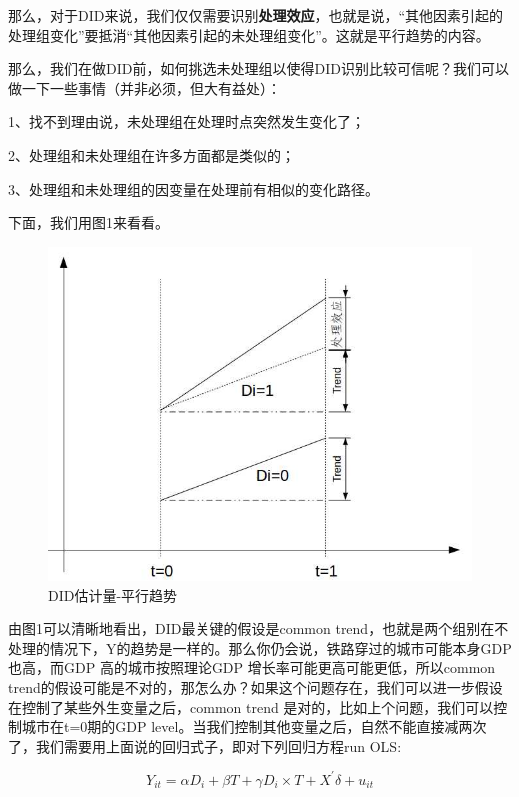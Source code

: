 \documentclass[cn,12pt,math=newtx,citestyle=gb7714-2015,bibstyle=gb7714-2015]{elegantbook}
\begin{document}
	那么，对于DID来说，我们仅仅需要识别\textbf{处理效应}，也就是说，“其他因素引起的处理组变化”要抵消“其他因素引起的未处理组变化”。这就是平行趋势的内容。
	
	那么，我们在做DID前，如何挑选未处理组以使得DID识别比较可信呢？我们可以做一下一些事情（并非必须，但大有益处）：
	
	1、找不到理由说，未处理组在处理时点突然发生变化了；
	
	2、处理组和未处理组在许多方面都是类似的；
	
	3、处理组和未处理组的因变量在处理前有相似的变化路径。
	
	
	下面，我们用图1来看看。
	\begin{figure}[htbp]
		\centering
		\includegraphics[width=1\textwidth]{commontrend.jpg}
		\caption{DID估计量-平行趋势}\label{fig:digit}
	\end{figure}
	
	由图1可以清晰地看出，DID最关键的假设是common trend，也就是两个组别在不处理的情况下，Y的趋势是一样的。那么你仍会说，铁路穿过的城市可能本身GDP也高，而GDP 高的城市按照理论GDP 增长率可能更高可能更低，所以common trend的假设可能是不对的，那怎么办？如果这个问题存在，我们可以进一步假设在控制了某些外生变量之后，common trend 是对的，比如上个问题，我们可以控制城市在t=0期的GDP level。当我们控制其他变量之后，自然不能直接减两次了，我们需要用上面说的回归式子，即对下列回归方程run OLS:
	
	\begin{equation}
		Y_{it}=\alpha{D}_i+\beta{T}+\gamma{D_i\times{T}}+X^{'}\delta+u_{it}
	\end{equation}
	
\end{document}

